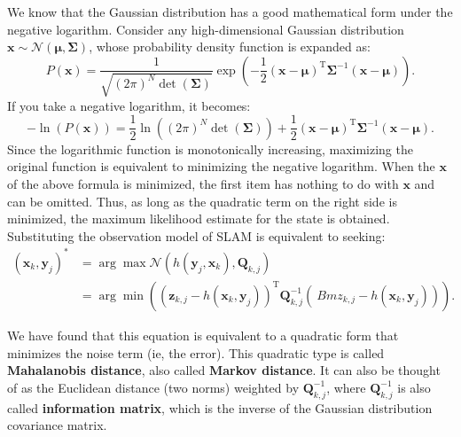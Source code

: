 We know that the Gaussian distribution has a good mathematical form under the negative logarithm. Consider any high-dimensional Gaussian distribution $\bm{x} \sim \mathcal{N}(\bm{\mu}, \bm{\Sigma})$, whose probability density function is expanded as:
\begin{equation}
P\left( \bm{x} \right) = \frac{1}{{\sqrt {{{(2\pi )}^N}\det ( \bm{\Sigma} )} }}\exp \left( { - \frac{1}{2}{{\left( { \bm{x} - \bm{\mu} } \right)}^\mathrm{T}}{ \bm{\Sigma} ^{ - 1}}\left( { \bm{x} - \bm{\mu} } \right)} \right).
\end{equation}
If you take a negative logarithm, it becomes:
\begin{equation}
- \ln \left( {P\left( \bm{x} \right)} \right) = \frac{1}{2}\ln \left( {{{\left( {2\pi } \right )}^N}\det \left( \bm{\Sigma} \right)} \right) + \frac{1}{2}{\left( { \bm{x} - \bm{\mu} } \right)^\mathrm{T}}{\bm{\Sigma} ^{ - 1}}\left( {\bm{x} - \bm{\mu} } \right).
\end{equation}
Since the logarithmic function is monotonically increasing, maximizing the original function is equivalent to minimizing the negative logarithm. When the $\bm{x}$ of the above formula is minimized, the first item has nothing to do with $\bm{x}$ and can be omitted. Thus, as long as the quadratic term on the right side is minimized, the maximum likelihood estimate for the state is obtained. Substituting the observation model of SLAM is equivalent to seeking:
\begin{equation}
\begin{aligned}
(\bm{x}_k,\bm{y}_j)^* &= \arg \max \mathcal{N}(h(\bm{y}_j, \bm{x}_k), \bm{Q }_{k,j}) \\ &= \arg \min \left( {{{\left( {{ \bm{z}_{k,j}} - h\left( {{\bm{x }_k},{\bm{y}_j}} \right)} \right)}^\mathrm{T}} \bm{Q}_{k,j}^{ - 1}\left( {{\ Bm{z}_{k,j}} - h\left( {{\bm{x}_k},{\bm{y}_j}} \right)} \right)} \right).
\end{aligned}
\end{equation}

We have found that this equation is equivalent to a quadratic form that minimizes the noise term (ie, the error). This quadratic type is called \textbf{Mahalanobis distance}, also called \textbf{Markov distance}. It can also be thought of as the Euclidean distance (two norms) weighted by $\bm{Q}_{k,j}^{-1}$, where $\bm{Q}_{k,j} ^{-1}$ is also called \textbf{information matrix}, which is the inverse of the Gaussian distribution covariance matrix.

